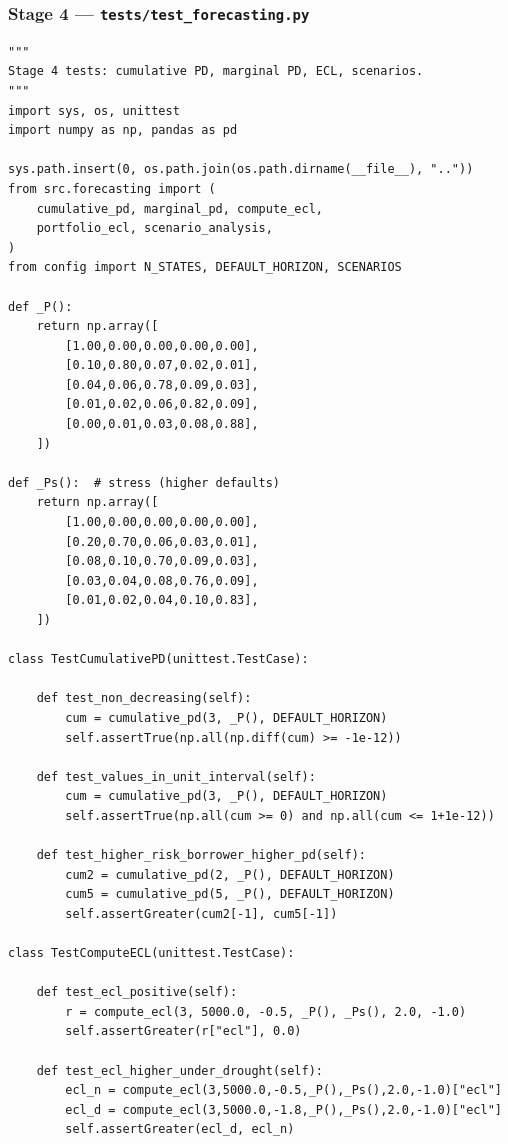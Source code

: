 \documentclass[12pt,a4paper]{article}
\begin{document}
\subsubsection{Stage 4 --- \texttt{tests/test\_forecasting.py}}

\begin{lstlisting}[caption={test\_forecasting.py --- Stage 4: ECL Forecasting}]
"""
Stage 4 tests: cumulative PD, marginal PD, ECL, scenarios.
"""
import sys, os, unittest
import numpy as np, pandas as pd

sys.path.insert(0, os.path.join(os.path.dirname(__file__), ".."))
from src.forecasting import (
    cumulative_pd, marginal_pd, compute_ecl,
    portfolio_ecl, scenario_analysis,
)
from config import N_STATES, DEFAULT_HORIZON, SCENARIOS

def _P():
    return np.array([
        [1.00,0.00,0.00,0.00,0.00],
        [0.10,0.80,0.07,0.02,0.01],
        [0.04,0.06,0.78,0.09,0.03],
        [0.01,0.02,0.06,0.82,0.09],
        [0.00,0.01,0.03,0.08,0.88],
    ])

def _Ps():  # stress (higher defaults)
    return np.array([
        [1.00,0.00,0.00,0.00,0.00],
        [0.20,0.70,0.06,0.03,0.01],
        [0.08,0.10,0.70,0.09,0.03],
        [0.03,0.04,0.08,0.76,0.09],
        [0.01,0.02,0.04,0.10,0.83],
    ])

class TestCumulativePD(unittest.TestCase):

    def test_non_decreasing(self):
        cum = cumulative_pd(3, _P(), DEFAULT_HORIZON)
        self.assertTrue(np.all(np.diff(cum) >= -1e-12))

    def test_values_in_unit_interval(self):
        cum = cumulative_pd(3, _P(), DEFAULT_HORIZON)
        self.assertTrue(np.all(cum >= 0) and np.all(cum <= 1+1e-12))

    def test_higher_risk_borrower_higher_pd(self):
        cum2 = cumulative_pd(2, _P(), DEFAULT_HORIZON)
        cum5 = cumulative_pd(5, _P(), DEFAULT_HORIZON)
        self.assertGreater(cum2[-1], cum5[-1])

class TestComputeECL(unittest.TestCase):

    def test_ecl_positive(self):
        r = compute_ecl(3, 5000.0, -0.5, _P(), _Ps(), 2.0, -1.0)
        self.assertGreater(r["ecl"], 0.0)

    def test_ecl_higher_under_drought(self):
        ecl_n = compute_ecl(3,5000.0,-0.5,_P(),_Ps(),2.0,-1.0)["ecl"]
        ecl_d = compute_ecl(3,5000.0,-1.8,_P(),_Ps(),2.0,-1.0)["ecl"]
        self.assertGreater(ecl_d, ecl_n)


\end{lstlisting}
\end{document}
